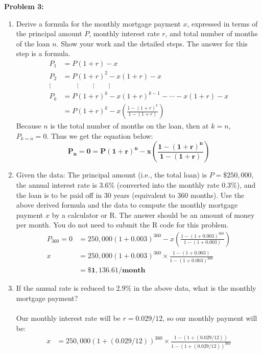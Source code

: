 \documentclass[11pt]{article}
\newenvironment{problem}[1]{\textbf{Problem #1: }}{\newpage}
\begin{document}
	\begin{problem}{3}
		\begin{enumerate}[label = (\alph*)]
			\item Derive a formula for the monthly mortgage payment $x$, expressed in terms of the
			principal amount $P$, monthly interest rate $r$, and total number of months of the loan $n$. Show your work
			and the detailed steps. The answer for this step is a formula.
			\begin{align*}
				P_1 &= P(1 + r) - x \\
				P_2 &= P(1 + r)^2 - x(1 + r) - x \\
				\vdots & \qquad \vdots \qquad \vdots \qquad \vdots \\
				P_k &= P(1 + r)^k - x(1 + r)^{k -1} - \cdots - x(1 + r) - x \\
				&= P(1 + r)^k - x\left(\frac{1 - (1 + r)^k}{1 - (1 + r)}\right)
			\end{align*}
			Because $n$ is the total number of months on the loan, then at $k = n$, $P_{k = n} = 0$. Thus we get the equation below:
			\[\boldsymbol{P_n = 0 = P(1 + r)^n - x\left(\frac{1 - (1 + r)^n}{1 - (1 + r)}\right) }\]
			\item Given the data: The principal amount (i.e., the total loan) is $P = \$250, 000$, the annual interest
			rate is 3.6\% (converted into the monthly rate 0.3\%), and the loan is to be paid off in 30 years (equivalent
			to 360 months). Use the above derived formula and the data to compute the monthly mortgage payment
			$x$ by a calculator or R. The answer should be an amount of money per month. You do not need to submit
			the R code for this problem.
			\begin{align*}
				P_{360} = 0 &= 250,000(1 + 0.003)^{360} - x\left(\frac{1 - (1 + 0.003)^{360}}{1 - (1 + 0.003)}\right) \\
				x &= 250,000(1 + 0.003)^{360} \times \frac{1 - (1 + 0.003)}{1 - (1 + 0.003)^{360}} \\
				&= \boldsymbol{\$1,136.61 / \textbf{month}}
			\end{align*}
			\item  If the annual rate is reduced to 2.9\% in the above data, what is the monthly mortgage payment?
			\\ \\
			Our monthly interest rate will be $r = 0.029 / 12$, so our monthly payment will be:
			\begin{align*}
				x &= 250,000(1 + (0.029 / 12))^{360} \times \frac{1 - (1 + (0.029 / 12))}{1 - (1 + (0.029 / 12))^{360}} \\

\end{align*}
\end{enumerate}
\end{problem}
\end{document}
